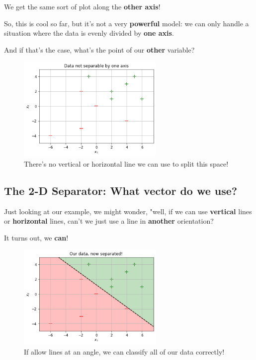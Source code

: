         We get the same sort of plot along the \textbf{other axis}!
        
        So, this is cool so far, but it's not a very \textbf{powerful} model: we can only handle a situation where the data is evenly divided by \textbf{one axis}.
        
        And if that's the case, what's the point of our \textbf{other} variable?
        
        \begin{figure}[H]
            \centering
                \includegraphics[width=70mm,scale=0.5]{images/classification_images/data_not_1d_separable.png}
                
                \caption*{There's no vertical or horizontal line we can use to split this space!}
        \end{figure}
        
    \subsection{The 2-D Separator: What vector do we use?}
    
        Just looking at our example, we might wonder, "well, if we can use \textbf{vertical} lines or \textbf{horizontal} lines, can't we just use a line in \textbf{another} orientation?
        
        It turns out, we \textbf{can}!
        
        \begin{figure}[H]
            \centering
                \includegraphics[width=70mm,scale=0.5]{images/classification_images/data_2d_separable.png}
                
                \caption*{If allow lines at an angle, we can classify all of our data correctly!}
        \end{figure}
        
